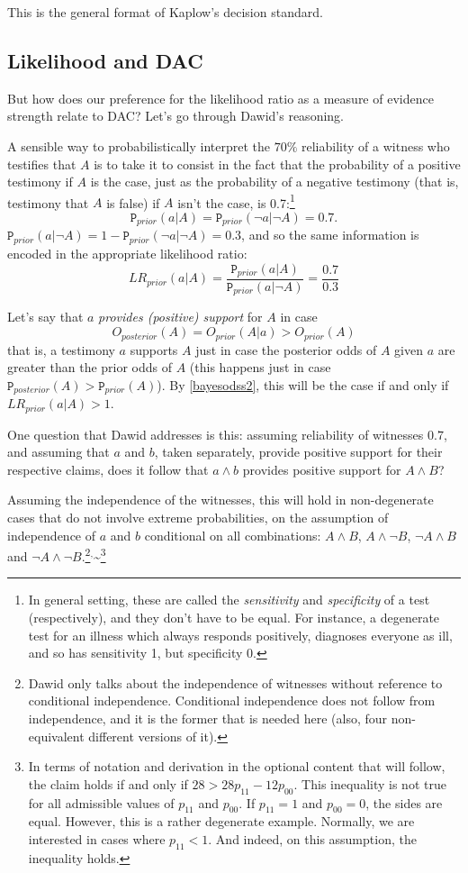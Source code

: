 \documentclass[10pt,dvipsnames,enabledeprecatedfontcommands]{scrartcl}
\newcommand{\n}{\neg}
\newcommand{\et}{\wedge}
\newcommand{\prr}[1]{\mbox{$\mathtt{P}_{prior}(#1)$}}
\newcommand{\prp}[1]{\mbox{$\mathtt{P}_{posterior}(#1)$}}
\begin{document}
\noindent This is the general format of Kaplow's decision standard.

\subsection{Likelihood and DAC}\label{likelihood-and-dac}

But how does our preference for the likelihood ratio as a measure of
evidence strength relate to DAC? Let's go through Dawid's reasoning.

A sensible way to probabilistically interpret the \(70\%\) reliability
of a witness who testifies that \(A\) is to take it to consist in the
fact that the probability of a positive testimony if \(A\) is the case,
just as the probability of a negative testimony (that is, testimony that
\(A\) is false) if \(A\) isn't the case, is
0.7:\footnote{In general setting, these are called the \emph{sensitivity} and \emph{specificity} of a test (respectively), and they don't have to be equal. For instance, a degenerate test for an illness which always responds positively, diagnoses everyone as ill, and so has sensitivity 1, but specificity 0.}
\[\prr{a\vert A}=\prr{\n a\vert\n  A}=0.7.\]
\noindent   \(\prr{a\vert \n A}=1- \prr{\n a\vert \n A}=0.3\), and so
the same information is encoded in the appropriate likelihood ratio:
\[LR_{prior}(a\vert A )=\frac{\prr{a\vert A}}{\prr{a\vert \n A}}= \frac{0.7}{0.3}\]

Let's say that \(a\) \emph{provides (positive) support} for \(A\) in
case \[O_{posterior}(A)=O_{prior}(A\vert a)> O_{prior}(A)\]
\noindent  that is, a testimony \(a\) supports \(A\) just in case the
posterior odds of \(A\) given \(a\) are greater than the prior odds of
\(A\) (this happens just in case \(\prp{A}>\prr{A}\)). By
\eqref{bayesodss2}, this will be the case if and only if
\(LR_{prior}(a\vert A)>1\).

One question that Dawid addresses is this: assuming reliability of
witnesses \(0.7\), and assuming that \(a\) and \(b\), taken separately,
provide positive support for their respective claims, does it follow
that \(a \et b\) provides positive support for \(A\et B\)?

Assuming the independence of the witnesses, this will hold in
non-degenerate cases that do not involve extreme probabilities, on the
assumption of independence of \(a\) and \(b\) conditional on all
combinations: \(A\et B\), \(A\et \n B\), \(\n A \et B\) and
\(\n A \et \n B\).\footnote{Dawid only talks about the independence of witnesses without reference to  conditional independence. Conditional independence does not follow from independence, and it is the former that is needed here (also, four non-equivalent different versions of it).}\(^,\)\textasciitilde{}\footnote{In terms of notation and derivation in the optional content that will follow, the claim holds  if and only if $28 > 28 p_{11}-12p_{00}$.  This inequality is not  true for all admissible values of $p_{11}$ and $p_{00}$. If $p_{11}=1$ and $p_{00}=0$, the sides are equal. However, this is a rather degenerate example. Normally, we are  interested in cases where $p_{11}< 1$. And indeed, on this assumption, the inequality holds.}
\end{document}

